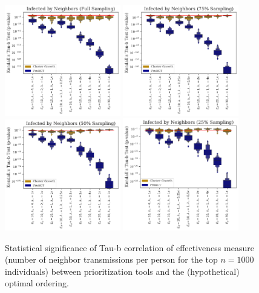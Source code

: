 \documentclass[a4paper,11pt]{article}
\begin{document}
\clearpage

\begin{figure}[!h]
\centering
\includegraphics[width=0.45\textwidth]{figs/results_efficacy_tau_pvalue_neighbors.pdf}
\includegraphics[width=0.45\textwidth]{figs/results_efficacy_tau_pvalue_neighbors_sub75.pdf}\\
\includegraphics[width=0.45\textwidth]{figs/results_efficacy_tau_pvalue_neighbors_sub50.pdf}
\includegraphics[width=0.45\textwidth]{figs/results_efficacy_tau_pvalue_neighbors_sub25.pdf}\\
\caption{Statistical significance of Tau-b correlation of effectiveness measure (number of neighbor transmissions per person for the top $n=1000$ individuals) between prioritization tools and the (hypothetical) optimal ordering.}\label{fig:tau-b-pvalues-neighbors}
\end{figure}
\end{document}
